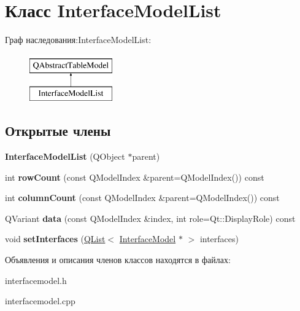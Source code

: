 \hypertarget{class_interface_model_list}{}\section{Класс Interface\+Model\+List}
\label{class_interface_model_list}
Граф наследования\+:Interface\+Model\+List\+:\begin{figure}[H]
\begin{center}
\leavevmode
\includegraphics[height=2.000000cm]{class_interface_model_list}
\end{center}
\end{figure}
\subsection*{Открытые члены}
\begin{DoxyCompactItemize}
\item 
{\bfseries Interface\+Model\+List} (Q\+Object $\ast$parent)\hypertarget{class_interface_model_list_a926a7248c32335cb27669f0220b2a1b5}{}\label{class_interface_model_list_a926a7248c32335cb27669f0220b2a1b5}

\item 
int {\bfseries row\+Count} (const Q\+Model\+Index \&parent=Q\+Model\+Index()) const \hypertarget{class_interface_model_list_ad8846f668c2fbffdd8de7cb602e775d4}{}\label{class_interface_model_list_ad8846f668c2fbffdd8de7cb602e775d4}

\item 
int {\bfseries column\+Count} (const Q\+Model\+Index \&parent=Q\+Model\+Index()) const \hypertarget{class_interface_model_list_a590c92f0cca76b9838a1537bd5d34518}{}\label{class_interface_model_list_a590c92f0cca76b9838a1537bd5d34518}

\item 
Q\+Variant {\bfseries data} (const Q\+Model\+Index \&index, int role=Qt\+::\+Display\+Role) const \hypertarget{class_interface_model_list_a4c319165cc4c9ce42530ba40c5f6ae48}{}\label{class_interface_model_list_a4c319165cc4c9ce42530ba40c5f6ae48}

\item 
void {\bfseries set\+Interfaces} (\hyperlink{class_q_list}{Q\+List}$<$ \hyperlink{class_interface_model}{Interface\+Model} $\ast$ $>$ interfaces)\hypertarget{class_interface_model_list_a90c904fdb3e2c825d565e8acadab864e}{}\label{class_interface_model_list_a90c904fdb3e2c825d565e8acadab864e}

\end{DoxyCompactItemize}


Объявления и описания членов классов находятся в файлах\+:\begin{DoxyCompactItemize}
\item 
interfacemodel.\+h\item 
interfacemodel.\+cpp\end{DoxyCompactItemize}
